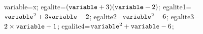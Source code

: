 \documentclass[exercice]{thedocument}%
\begin{document}
%
    \>variable=x;%
    \>egalite={$(\<variable;+3)(\<variable;-2)$};%
    \>egalite1=${\<variable;^2}+3{\<variable;}-2$;%
    \>egalite2=${\<variable;}^2-6$;%
    \>egalite3=$2\times{\<variable;}+1$;%
    \>egalite4=${\<variable;^2}+{\<variable;}-6$;%
\end{document}
